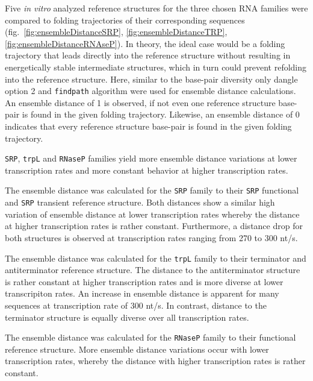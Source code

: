 \documentclass[ twoside,openright,titlepage,numbers=noenddot,headinclude,%
                footinclude=false, cleardoublepage=empty,abstractoff, %
                BCOR=5mm,paper=a4,fontsize=11pt,%
                ngerman,american,%
                ]{scrreprt}
\begin{document}
Five \textit{in vitro} analyzed reference structures for the three chosen
RNA families were compared to folding trajectories of their corresponding
sequences (fig.~\ref{fig:ensembleDistanceSRP},
\ref{fig:ensembleDistanceTRP}, \ref{fig:ensembleDistanceRNAseP}). In theory,
the ideal case would be a folding trajectory that leads directly into the
reference structure without resulting in energetically stable intermediate
structures, which in turn could prevent refolding into the reference structure. 
Here, similar to the base-pair diversity only dangle option 2 and \texttt{findpath} algorithm were used for ensemble distance calculations.
An ensemble distance of 1 is observed, if not even one reference structure base-pair is found in the given folding trajectory.
Likewise, an ensemble distance of 0 indicates that every reference structure base-pair is found in the given folding trajectory.


\texttt{SRP}, \texttt{trpL} and \texttt{RNaseP} families yield more ensemble distance variations at lower transcription rates and more constant behavior at higher transcription rates.

The ensemble distance was calculated for the \texttt{SRP} family to their \texttt{SRP}
functional and \texttt{SRP} transient reference structure.
Both distances show a similar high variation of ensemble distance at lower transcription rates whereby the distance at higher transcription rates is rather constant. Furthermore, a distance drop for both structures is observed at transcription rates ranging from 270 to 300 nt/s.

The ensemble distance was calculated for the \texttt{trpL} family to their terminator and antiterminator reference structure.
The distance to the antiterminator structure is rather constant at higher transcription rates and is more diverse at lower transcripiton rates. An increase in ensemble distance is apparent for many sequences at transcription rate of 300 nt/s.
In contrast, distance to the terminator structure is equally diverse over all transcription rates.

The ensemble distance was calculated for the \texttt{RNaseP} family to their functional reference structure.
More ensemble distance variations occur with lower transcription rates, whereby the distance with higher transcription rates is rather constant.
\end{document}

